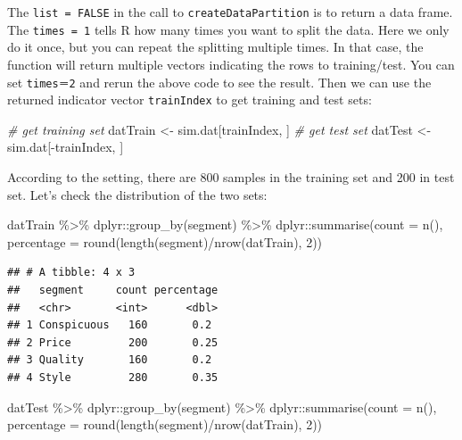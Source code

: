 \documentclass[
  12pt,
]{krantz}
\makeatletter
\newenvironment{Shaded}{\begin{snugshade}}{\end{snugshade}}
\newcommand{\AttributeTok}[1]{\textcolor[rgb]{0.61,0.61,0.61}{#1}}
\newcommand{\CommentTok}[1]{\textcolor[rgb]{0.37,0.37,0.37}{\textit{#1}}}
\newcommand{\DecValTok}[1]{\textcolor[rgb]{0.06,0.06,0.06}{#1}}
\newcommand{\FunctionTok}[1]{\textcolor[rgb]{0,0,0}{#1}}
\newcommand{\NormalTok}[1]{#1}
\newcommand{\OtherTok}[1]{\textcolor[rgb]{0.37,0.37,0.37}{#1}}
\newcommand{\SpecialCharTok}[1]{\textcolor[rgb]{0,0,0}{#1}}
\newenvironment{kframe}{%
\medskip{}
\setlength{\fboxsep}{.8em}
 \def\at@end@of@kframe{}%
 \ifinner\ifhmode%
  \def\at@end@of@kframe{\end{minipage}}%
  \begin{minipage}{\columnwidth}%
 \fi\fi%
 \def\FrameCommand##1{\hskip\@totalleftmargin \hskip-\fboxsep
 \colorbox{shadecolor}{##1}\hskip-\fboxsep
     \hskip-\linewidth \hskip-\@totalleftmargin \hskip\columnwidth}%
 \MakeFramed {\advance\hsize-\width
   \@totalleftmargin\z@ \linewidth\hsize
   \@setminipage}}%
 {\par\unskip\endMakeFramed%
 \at@end@of@kframe}
\renewenvironment{Shaded}{\begin{kframe}}{\end{kframe}}
\makeatother
\begin{document}
The \texttt{list\ =\ FALSE} in the call to \texttt{createDataPartition} is to return a data frame. The \texttt{times\ =\ 1} tells R how many times you want to split the data. Here we only do it once, but you can repeat the splitting multiple times. In that case, the function will return multiple vectors indicating the rows to training/test. You can set \texttt{times＝2} and rerun the above code to see the result. Then we can use the returned indicator vector \texttt{trainIndex} to get training and test sets:

\begin{Shaded}
\begin{Highlighting}[]
\CommentTok{\# get training set}
\NormalTok{datTrain }\OtherTok{\textless{}{-}}\NormalTok{ sim.dat[trainIndex, ]}
\CommentTok{\# get test set}
\NormalTok{datTest }\OtherTok{\textless{}{-}}\NormalTok{ sim.dat[}\SpecialCharTok{{-}}\NormalTok{trainIndex, ]}
\end{Highlighting}
\end{Shaded}

According to the setting, there are 800 samples in the training set and 200 in test set. Let's check the distribution of the two sets:

\begin{Shaded}
\begin{Highlighting}[]
\NormalTok{datTrain }\SpecialCharTok{\%\textgreater{}\%}
\NormalTok{  dplyr}\SpecialCharTok{::}\FunctionTok{group\_by}\NormalTok{(segment) }\SpecialCharTok{\%\textgreater{}\%}
\NormalTok{  dplyr}\SpecialCharTok{::}\FunctionTok{summarise}\NormalTok{(}\AttributeTok{count =} \FunctionTok{n}\NormalTok{(),}
            \AttributeTok{percentage =} \FunctionTok{round}\NormalTok{(}\FunctionTok{length}\NormalTok{(segment)}\SpecialCharTok{/}\FunctionTok{nrow}\NormalTok{(datTrain), }\DecValTok{2}\NormalTok{))}
\end{Highlighting}
\end{Shaded}

\begin{verbatim}
## # A tibble: 4 x 3
##   segment     count percentage
##   <chr>       <int>      <dbl>
## 1 Conspicuous   160       0.2 
## 2 Price         200       0.25
## 3 Quality       160       0.2 
## 4 Style         280       0.35
\end{verbatim}

\begin{Shaded}
\begin{Highlighting}[]
\NormalTok{datTest }\SpecialCharTok{\%\textgreater{}\%}
\NormalTok{  dplyr}\SpecialCharTok{::}\FunctionTok{group\_by}\NormalTok{(segment) }\SpecialCharTok{\%\textgreater{}\%}
\NormalTok{  dplyr}\SpecialCharTok{::}\FunctionTok{summarise}\NormalTok{(}\AttributeTok{count =} \FunctionTok{n}\NormalTok{(),}
            \AttributeTok{percentage =} \FunctionTok{round}\NormalTok{(}\FunctionTok{length}\NormalTok{(segment)}\SpecialCharTok{/}\FunctionTok{nrow}\NormalTok{(datTrain), }\DecValTok{2}\NormalTok{))}
\end{Highlighting}
\end{Shaded}
\end{document}
